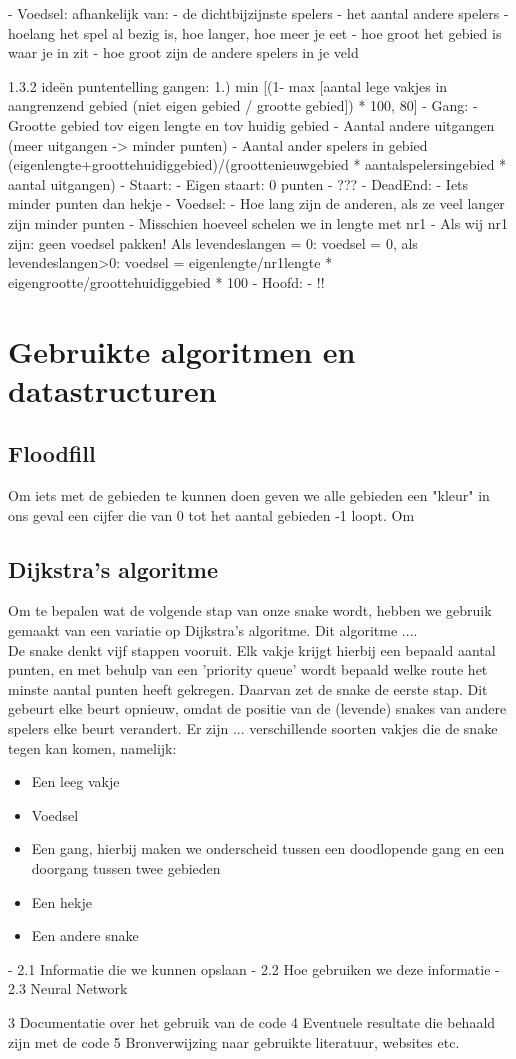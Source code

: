 \documentclass{article}
\begin{document}
- Voedsel:
    afhankelijk van:
     - de dichtbijzijnste spelers
     - het aantal andere spelers
     - hoelang het spel al bezig is, hoe langer, hoe meer je eet
     - hoe groot het gebied is waar je in zit
     - hoe groot zijn de andere spelers in je veld



1.3.2 ideën puntentelling gangen:
1.)
 min [(1- max [aantal lege vakjes in aangrenzend gebied (niet eigen gebied / grootte gebied]) * 100,
      80]
- Gang:
  - Grootte gebied tov eigen lengte en tov huidig gebied
  - Aantal andere uitgangen (meer uitgangen -> minder punten)
  - Aantal ander spelers in gebied
  (eigenlengte+groottehuidiggebied)/(groottenieuwgebied * aantalspelersingebied * aantal uitgangen)
- Staart:
  - Eigen staart: 0 punten
  - ???
- DeadEnd:
  - Iets minder punten dan hekje
- Voedsel:
  - Hoe lang zijn de anderen, als ze veel langer zijn minder punten
  - Misschien hoeveel schelen we in lengte met nr1
  - Als wij nr1 zijn: geen voedsel pakken!
 Als levendeslangen = 0: voedsel = 0, als levendeslangen>0: voedsel = eigenlengte/nr1lengte * eigengrootte/groottehuidiggebied * 100
- Hoofd:
  - !!
      

\section{Gebruikte algoritmen en datastructuren}
\subsection{Floodfill \label{FF}}
Om iets met de gebieden te kunnen doen geven we alle gebieden een "kleur" in ons geval een cijfer die van 0 tot het aantal gebieden -1 loopt. Om

\subsection{Dijkstra's algoritme}
Om te bepalen wat de volgende stap van onze snake wordt, hebben we gebruik gemaakt van een variatie op Dijkstra's algoritme. Dit algoritme ....
\\
De snake denkt vijf stappen vooruit. Elk vakje krijgt hierbij een bepaald aantal punten, en met behulp van een 'priority queue' wordt bepaald welke route het minste aantal punten heeft gekregen. Daarvan zet de snake de eerste stap. Dit gebeurt elke beurt opnieuw, omdat de positie van de (levende) snakes van andere spelers elke beurt verandert. Er zijn ... verschillende soorten vakjes die de snake tegen kan komen, namelijk:
\begin{itemize}
\item Een leeg vakje
\item Voedsel
\item Een gang, hierbij maken we onderscheid tussen een doodlopende gang en een doorgang tussen twee gebieden
\item Een hekje
\item Een andere snake
\end{itemize}



- 2.1 Informatie die we kunnen opslaan
- 2.2 Hoe gebruiken we deze informatie
- 2.3 Neural Network


3 Documentatie over het gebruik van de code
4 Eventuele resultate die behaald zijn met de code
5 Bronverwijzing naar gebruikte literatuur, websites etc.




     
\end{document}

